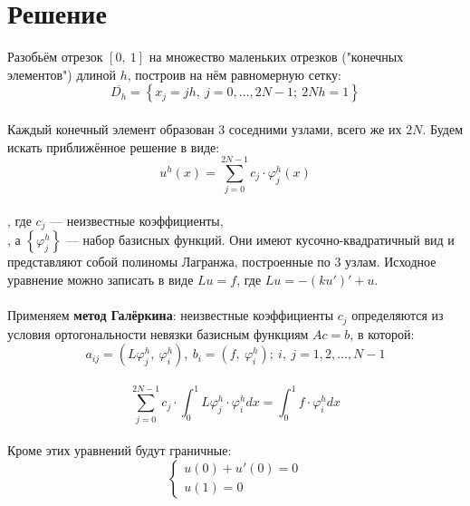 \documentclass[12pt, a4paper]{article}
\begin{document}
	\section{Решение}
	\vspace{0.5cm}
	Разобьём отрезок $\left[0,\ 1\right]$ на множество маленьких отрезков
	("конечных элементов") длиной $h$, построив на нём равномерную сетку:\\
	\begin{equation}
		\overline{D_h} = \left\{ x_j = jh,\ j = 0, \ldots, 2N-1;\ 2Nh = 1 \right\}
	\end{equation}\\
	Каждый конечный элемент образован 3 соседними узлами, всего же их $2N$.
	Будем искать приближённое решение в виде:\\
	\begin{equation}
		u^{h}(x) = \sum\limits_{j = 0}^{2N-1} c_j \cdot \varphi_j^h(x)
	\end{equation}\\
	, где $c_j$ --- неизвестные коэффициенты,\\
	, а $\left\{\varphi_j^h\right\}$ --- набор базисных функций. 
	Они имеют кусочно-квадратичный вид и представляют собой полиномы Лагранжа, 
	построенные по 3 узлам. Исходное уравнение можно записать в виде 
	$Lu = f$, где $Lu = -(ku')' + u$.\\\\
	Применяем \textbf{метод Галёркина}: 
	неизвестные коэффициенты $c_j$ определяются из условия
	ортогональности невязки базисным функциям $Ac = b$, в которой:\\
	\begin{equation}
		a_{ij} = \left( L\varphi_j^h,\ \varphi_i^h \right),\
		b_i = \left( f,\ \varphi_i^h \right);\
		i,\ j = 1,2,\ldots,N-1
	\end{equation}\\
	\begin{equation}
		\sum\limits_{j = 0}^{2N-1} c_j 
		\cdot 
		\int_{0}^{1} L\varphi_j^h \cdot \varphi_i^h dx = 
		\int_{0}^{1} f \cdot \varphi_i^h dx
	\end{equation}\\
	Кроме этих уравнений будут граничные:
	\begin{equation}
		\begin{cases}
			u(0) + u'(0) = 0\\
			u(1) = 0
		\end{cases}
	\end{equation}\\
\end{document}
